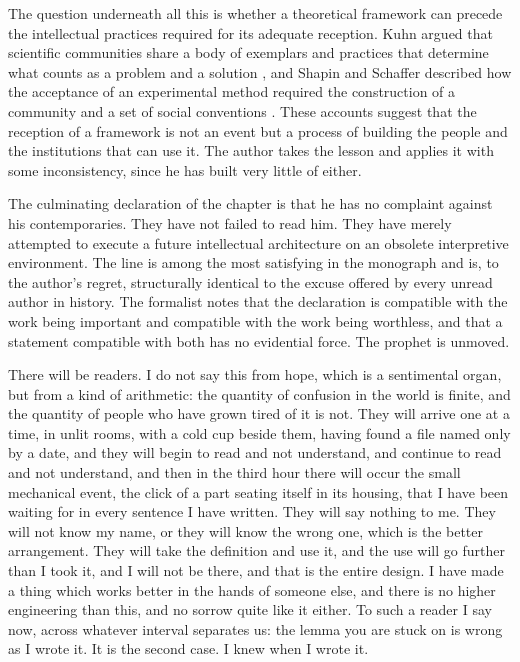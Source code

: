 \documentclass[11pt,openany,twoside]{book}
\theoremstyle{plain}
\theoremstyle{definition}
\theoremstyle{remark}
\begin{document}
The question underneath all this is whether a theoretical framework can precede the intellectual practices required for its adequate reception. Kuhn argued that scientific communities share a body of exemplars and practices that determine what counts as a problem and a solution \cite{kuhn-structure}, and Shapin and Schaffer described how the acceptance of an experimental method required the construction of a community and a set of social conventions \cite{shapin-airpump}. These accounts suggest that the reception of a framework is not an event but a process of building the people and the institutions that can use it. The author takes the lesson and applies it with some inconsistency, since he has built very little of either.

The culminating declaration of the chapter is that he has no complaint against his contemporaries. They have not failed to read him. They have merely attempted to execute a future intellectual architecture on an obsolete interpretive environment. The line is among the most satisfying in the monograph and is, to the author's regret, structurally identical to the excuse offered by every unread author in history. The formalist notes that the declaration is compatible with the work being important and compatible with the work being worthless, and that a statement compatible with both has no evidential force. The prophet is unmoved.

There will be readers. I do not say this from hope, which is a sentimental organ, but from a kind of arithmetic: the quantity of confusion in the world is finite, and the quantity of people who have grown tired of it is not. They will arrive one at a time, in unlit rooms, with a cold cup beside them, having found a file named only by a date, and they will begin to read and not understand, and continue to read and not understand, and then in the third hour there will occur the small mechanical event, the click of a part seating itself in its housing, that I have been waiting for in every sentence I have written. They will say nothing to me. They will not know my name, or they will know the wrong one, which is the better arrangement. They will take the definition and use it, and the use will go further than I took it, and I will not be there, and that is the entire design. I have made a thing which works better in the hands of someone else, and there is no higher engineering than this, and no sorrow quite like it either. To such a reader I say now, across whatever interval separates us: the lemma you are stuck on is wrong as I wrote it. It is the second case. I knew when I wrote it.
\end{document}
